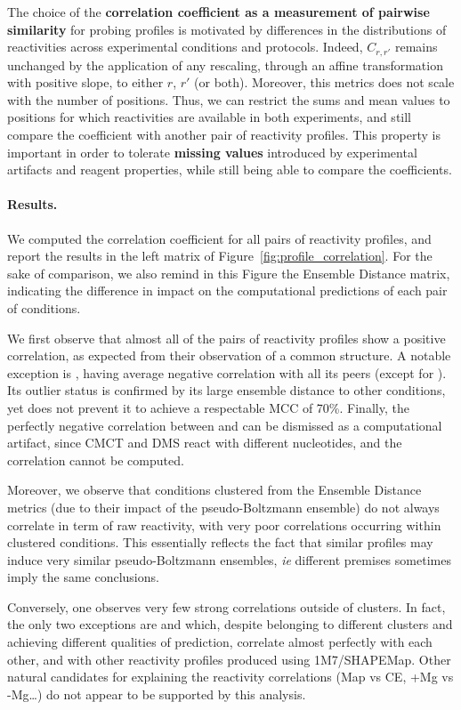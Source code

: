 \documentclass[11pt]{article} %
\renewcommand{\Def}[1]{{\bf #1}}
\begin{document}
The choice of the \Def{correlation coefficient as a measurement of pairwise similarity} for probing profiles is motivated by differences in the distributions of reactivities across experimental conditions and protocols. 
Indeed, $C_{r,r'}$ remains unchanged by the application of any rescaling, through an affine transformation with positive slope, to either $r$, $r'$ (or both). Moreover, this metrics does not scale with the number of positions.
Thus, we can restrict the sums and mean values to positions for which reactivities are available in both experiments, and still compare the coefficient with another pair of reactivity profiles. This property is important in order to tolerate \Def{missing values} introduced by experimental artifacts and reagent properties, while still being able to compare the coefficients.

\paragraph{Results.} We computed the correlation coefficient for all pairs of reactivity profiles, and report the results in the left matrix of Figure~\ref{fig:profile_correlation}. For the sake of comparison, we also remind in this Figure the Ensemble Distance matrix, indicating the difference in impact on the computational predictions of each pair of conditions.

We first observe that almost all of the pairs of reactivity profiles show a positive correlation, as expected from their observation of a common structure. A notable exception is \OneMSevMgCE, having average negative correlation with all its peers (except for \NMIAMgCE). Its outlier status is confirmed by its large ensemble distance to other conditions, yet does not prevent it to achieve a respectable MCC of 70\%. Finally, the perfectly negative correlation between \CMCTMg{} and \DMSMg{} can be dismissed as a computational artifact, since CMCT and DMS react with different nucleotides, and the correlation cannot be computed.

Moreover, we observe that conditions clustered from the Ensemble Distance metrics (due to their impact of the pseudo-Boltzmann ensemble) do not always correlate in term of raw reactivity, with very poor correlations occurring within clustered conditions. This essentially reflects the fact that similar profiles may induce very similar pseudo-Boltzmann ensembles, \emph{ie} different premises sometimes imply the same conclusions. 

Conversely, one observes very few strong correlations outside of clusters. In fact, the only two exceptions are \OneMSevILU and \OneMSevILUThree which, despite belonging to different clusters and achieving different qualities of prediction, correlate almost perfectly with each other, and with other reactivity profiles produced using 1M7/SHAPEMap. Other natural candidates for explaining the reactivity correlations (Map vs CE, +Mg vs -Mg\ldots) do not appear to be supported by this analysis.
\end{document}
